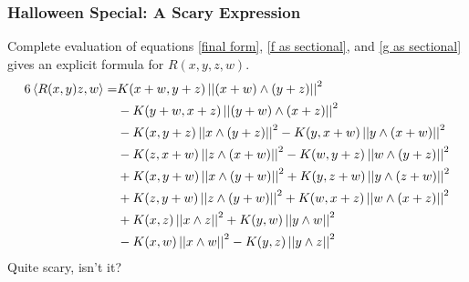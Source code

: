 \begin{frame}
\frametitle{Halloween Special: A Scary Expression}
Complete evaluation of equations \ref{final form}, \ref{f as sectional}, and \ref{g as sectional} gives an explicit formula for $R(x,y,z,w)$.
{\footnotesize
\begin{align*}
6\inner{R(x,y)z,w}=&K(x+w,y+z)\norm{(x+w)\wedge (y+z)}^2\\
&-K(y+w,x+z)\norm{(y+w)\wedge (x+z)}^2\\
&-K(x,y+z)\norm{x\wedge (y+z)}^2-K(y,x+w)\norm{y\wedge (x+w)}^2\\
&-K(z,x+w)\norm{z\wedge (x+w)}^2-K(w,y+z)\norm{w\wedge (y+z)}^2\\
&+K(x,y+w)\norm{x\wedge (y+w)}^2+K(y,z+w)\norm{y\wedge (z+w)}^2\\
&+K(z,y+w)\norm{z\wedge (y+w)}^2+K(w,x+z)\norm{w\wedge (x+z)}^2\\
&+K(x,z)\norm{x\wedge z}^2+K(y,w)\norm{y\wedge w}^2\\ 
&-K(x,w)\norm{x\wedge w}^2-K(y,z)\norm{y\wedge z}^2\\ 
\end{align*}
}%
Quite scary, isn't it?
\end{frame}
